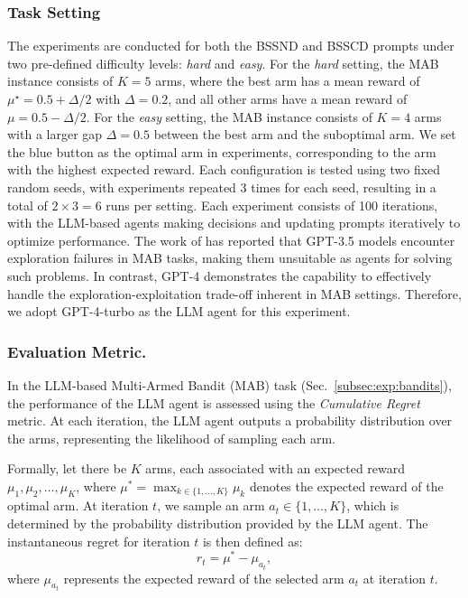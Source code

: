 \subsubsection{Task Setting}
The experiments are conducted for both the BSSND and BSSCD prompts under two pre-defined difficulty levels: \textit{hard} and \textit{easy}. For the \textit{hard} setting, the MAB instance consists of $K=5$ arms, where the best arm has a mean reward of $\mu^\star = 0.5 + \Delta / 2$ with $\Delta = 0.2$, and all other arms have a mean reward of $\mu = 0.5 - \Delta / 2$. For the \textit{easy} setting, the MAB instance consists of $K=4$ arms with a larger gap $\Delta = 0.5$ between the best arm and the suboptimal arm.
We set the blue button as the optimal arm in experiments, corresponding to the arm with the highest expected reward. Each configuration is tested using two fixed random seeds, with experiments repeated 3 times for each seed, resulting in a total of \(2 \times 3 = 6\) runs per setting. Each experiment consists of 100 iterations, with the LLM-based agents making decisions and updating prompts iteratively to optimize performance.
The work of \citet{krishnamurthy2024can} has reported that GPT-3.5 models encounter exploration failures in MAB tasks, making them unsuitable as agents for solving such problems. In contrast, GPT-4 demonstrates the capability to effectively handle the exploration-exploitation trade-off inherent in MAB settings. Therefore, we adopt GPT-4-turbo as the LLM agent for this experiment. 


\subsubsection{Evaluation Metric.}
In the LLM-based Multi-Armed Bandit (MAB) task (Sec.~\ref{subsec:exp:bandits}), the performance of the LLM agent is assessed using the \textit{Cumulative Regret} metric. At each iteration, the LLM agent outputs a probability distribution over the arms, representing the likelihood of sampling each arm.

Formally, let there be \(K\) arms, each associated with an expected reward \(\mu_1, \mu_2, \dots, \mu_K\), where \(\mu^* = \max_{k \in \{1, \dots, K\}} \mu_k\) denotes the expected reward of the optimal arm. At iteration \(t\), we sample an arm \(a_t \in \{1, \dots, K\}\), which is determined by the probability distribution provided by the LLM agent. The instantaneous regret for iteration \(t\) is then defined as:
\[
r_t = \mu^* - \mu_{a_t},
\]
where \(\mu_{a_t}\) represents the expected reward of the selected arm \(a_t\) at iteration \(t\).

